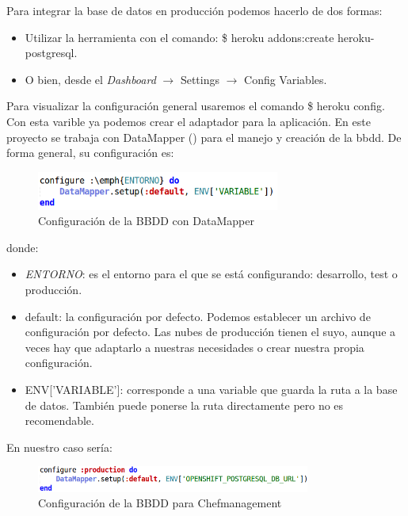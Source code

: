 Para integrar la base de datos en producción podemos hacerlo de dos formas:
\begin{itemize}
	\item Utilizar la herramienta con el comando: \$ heroku addons:create heroku-postgresql.
	\item O bien, desde el \emph{Dashboard} $\rightarrow$ Settings $\rightarrow$ Config Variables.
\end{itemize}

Para visualizar la configuración general usaremos el comando \$ heroku config. Con esta varible ya podemos crear el adaptador para la aplicación. En este proyecto se trabaja con DataMapper (\cite{URL:DataMapper}) para el manejo y creación de la bbdd. De forma general, su configuración es: \\

\begin{figure}[H]
	\centering
	\includegraphics[width=8cm]{./images/env01.png}
	\caption{Configuración de la BBDD con DataMapper} \label{fig:env01}
\end{figure}
 
 donde:
 \begin{itemize}
	 \item \emph{ENTORNO}: es el entorno para el que se está configurando: desarrollo, test o producción.
	\item default: la configuración por defecto. Podemos establecer un archivo de configuración por defecto. Las nubes de producción tienen el suyo, aunque a veces hay que adaptarlo a nuestras necesidades o crear nuestra propia configuración.
	\item ENV['VARIABLE']: corresponde a una variable que guarda la ruta a la base de datos. También puede ponerse la ruta directamente pero no es recomendable.
\end{itemize}

En nuestro caso sería: \\

\begin{figure}[H]
	\centering
	\includegraphics[width=9cm]{./images/env02.png}
	\caption{Configuración de la BBDD para Chefmanagement} \label{fig:env02}
\end{figure}

